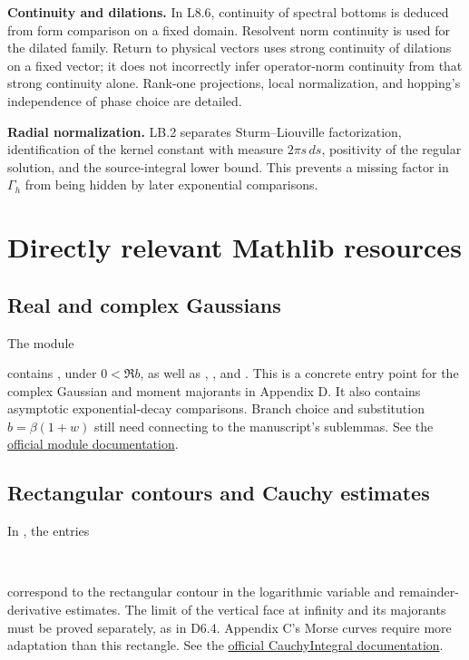 \documentclass[11pt,a4paper]{article}
\newcommand{\code}[1]{\texttt{\detokenize{#1}}}
\begin{document}
\textbf{Continuity and dilations.} In L8.6, continuity of spectral bottoms is
deduced from form comparison on a fixed domain. Resolvent norm continuity is
used for the dilated family. Return to physical vectors uses strong continuity
of dilations on a fixed vector; it does not incorrectly infer operator-norm
continuity from that strong continuity alone. Rank-one projections, local
normalization, and hopping's independence of phase choice are detailed.

\textbf{Radial normalization.} LB.2 separates Sturm--Liouville factorization,
identification of the kernel constant with measure $2\pi s\,ds$, positivity of
the regular solution, and the source-integral lower bound. This prevents a
missing factor in $\Gamma_h$ from being hidden by later exponential comparisons.

\section{Directly relevant Mathlib resources}
\subsection{Real and complex Gaussians}
The module
\begin{center}\small{}\end{center}
contains \code{integral_gaussian_complex}, under $0<\Re b$, as well as
, , and
. This is a concrete entry point for
the complex Gaussian and moment majorants in Appendix D. It also contains
asymptotic exponential-decay comparisons. Branch choice and substitution
$b=\beta(1+w)$ still need connecting to the manuscript's sublemmas. See the
\href{https://leanprover-community.github.io/mathlib4_docs/Mathlib/Analysis/SpecialFunctions/Gaussian/GaussianIntegral.html}{official module documentation}.

\subsection{Rectangular contours and Cauchy estimates}
In , the entries
\begin{center}\small
{}\\
\end{center}
correspond to the rectangular contour in the logarithmic variable and
remainder-derivative estimates. The limit of the vertical face at infinity
and its majorants must be proved separately, as in D6.4. Appendix C's Morse
curves require more adaptation than this rectangle. See the
\href{https://leanprover-community.github.io/mathlib4_docs/Mathlib/Analysis/Complex/CauchyIntegral.html}{official CauchyIntegral documentation}.
\end{document}
